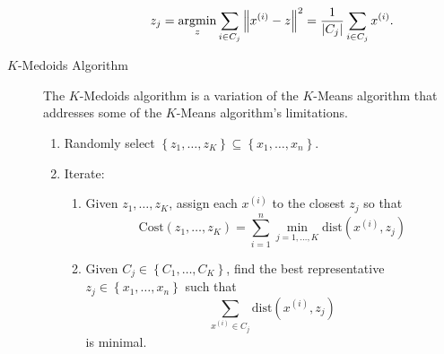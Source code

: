 \documentclass[10pt,landscape,a4paper]{article}
\DeclareMathOperator*{\argmin}{argmin}
\begin{document}
\begin{multicols*}{3}
\begin{description}
\begin{enumerate}
\begin{enumerate}
			$$z_j=\argmin\limits_{z}\sum_{i\in C_j}\norm{x^{(i)}-z}^2=\dfrac{1}{\left|C_j\right|}\sum\limits_{i\in C_j}x^{(i)}.$$
		\end{enumerate}
	\end{enumerate}
	\item[$K$-Medoids Algorithm] The $K$-Medoids algorithm is a variation of the $K$-Means algorithm that addresses some of the $K$-Means algorithm's limitations.
	\begin{enumerate}
		\item Randomly select $\left\{z_1,\dots,z_K\right\}\subseteq\left\{x_1,\dots,x_n\right\}$.
		\item Iterate:
		\begin{enumerate}
			\item Given $z_1,\dots,z_K$, assign each $x^{(i)}$ to the closest $z_j$ so that
			$$\text{Cost}\left(z_1,\dots,z_K\right)=\sum_{i=1}^{n}\min\limits_{j=1,\dots,K}\text{dist}\left(x^{(i)},z_j\right)$$
			\item Given $C_j\in\left\{C_1,\dots,C_K\right\}$, find the best representative $z_j\in\left\{x_1,\dots,x_n\right\}$ such that
			$$\sum\limits_{x^{(i)}\in C_j}\text{dist}\left(x^{(i)},z_j\right)$$
			is minimal.
		\end{enumerate}
	\end{enumerate}
\end{description}


\end{multicols*}
\end{document}
